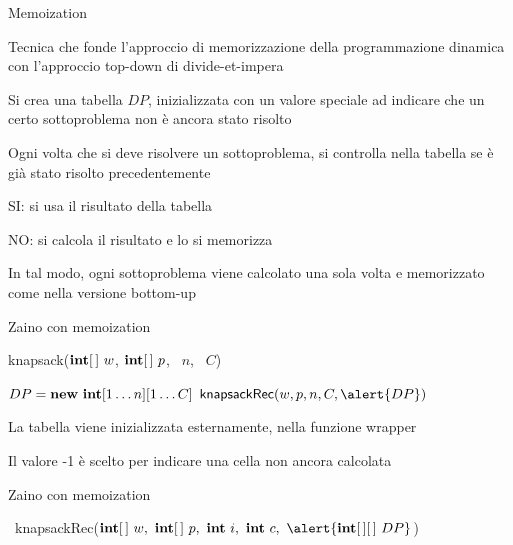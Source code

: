 \begin{frame}{Memoization}

\vspace{-9pt}
\begin{myboxtitle}
Tecnica che fonde l'approccio di memorizzazione della programmazione dinamica con l'approccio top-down di divide-et-impera
\end{myboxtitle}

\BIL
\item Si crea una tabella $DP$, inizializzata con un \alert{valore speciale} ad 
indicare che un certo sottoproblema non è ancora stato risolto
\item Ogni volta che si deve risolvere un sottoproblema, si controlla nella tabella se è già stato risolto precedentemente
\BI
\item SI:  si usa il risultato della tabella
\item NO:  si calcola il risultato e lo si memorizza
\EI
\item In tal modo, ogni sottoproblema viene calcolato una sola volta e memorizzato come nella versione bottom-up
\EIL

\end{frame}

\begin{frame}{Zaino con memoization}

\vspace{-9pt}
\begin{Procedure}
\caption[A]{\textsf{knapsack}($\INTEGER[\,]\ w$, $\INTEGER[\,]\ p$, \INTEGER\ $n$, \INTEGER\ $C$)}
\alert{$DP = \NEW\ \INTEGER[1 \ldots n][1 \ldots C]$\;
}
\Return $\textsf{knapsackRec}(w, p, n, C, \alert{DP})$
\end{Procedure}

\BIL
\item La tabella viene inizializzata esternamente, nella funzione wrapper
\item Il valore -1 è scelto per indicare una cella non ancora calcolata
\EIL

\end{frame}

\begin{frame}{Zaino con memoization}

\vspace{-9pt}
\begin{Procedure}
\caption[A]{\INTEGER\ \textsf{knapsackRec}($\INTARRAY\ w,\ \INTARRAY\ p,\  \INTEGER\ i,\ \INTEGER\ c,\ \alert{\INTARRAY[\,]\ DP}$)}

\end{Procedure}

\end{frame}



